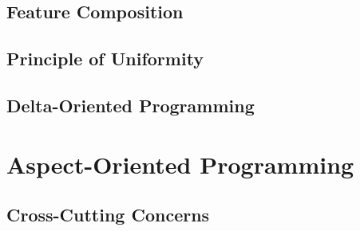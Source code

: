 \documentclass[
	aspectratio=169, %
	8pt, %
	handout, %
]{beamer}
\begin{document}
\subsection{Feature Composition}
\subsection{Principle of Uniformity}
% 

\subsection{Delta-Oriented Programming}

%

\lessonslearned{
	\item \ldots
}{
	\item \ldots
}{
	\ldots
}

\sectionend

\section{Aspect-Oriented Programming}

\subsection{Cross-Cutting Concerns}

\lessonslearned{
	\item \ldots
}{
	\item \ldots
}{
	\ldots
}


\end{document}
